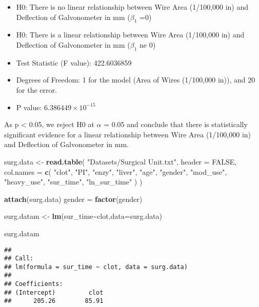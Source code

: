 \documentclass[
]{article}
\newenvironment{Shaded}{\begin{snugshade}}{\end{snugshade}}
\newcommand{\AttributeTok}[1]{\textcolor[rgb]{0.13,0.29,0.53}{#1}}
\newcommand{\ConstantTok}[1]{\textcolor[rgb]{0.56,0.35,0.01}{#1}}
\newcommand{\FunctionTok}[1]{\textcolor[rgb]{0.13,0.29,0.53}{\textbf{#1}}}
\newcommand{\NormalTok}[1]{#1}
\newcommand{\OtherTok}[1]{\textcolor[rgb]{0.56,0.35,0.01}{#1}}
\newcommand{\SpecialCharTok}[1]{\textcolor[rgb]{0.81,0.36,0.00}{\textbf{#1}}}
\newcommand{\StringTok}[1]{\textcolor[rgb]{0.31,0.60,0.02}{#1}}
\begin{document}
\begin{itemize}
\item
  H0: There is no linear relationship between Wire Area (1/100,000 in)
  and Deflection of Galvonometer in mm (\(\beta_1\) =0)
\item
  H0: There is a linear relationship between Wire Area (1/100,000 in)
  and Deflection of Galvonometer in mm (\(\beta_1\) ne 0)
\item
  Test Statistic (F value): 422.6036859
\item
  Degrees of Freedom: 1 for the model (Area of Wires (1/100,000 in)),
  and 20 for the error.
\item
  P value: \ensuremath{6.386449\times 10^{-15}}
\end{itemize}

As p \textless{} 0.05, we reject H0 at \(\alpha\) = 0.05 and conclude
that there is statistically significant evidence for a linear
relationship between Wire Area (1/100,000 in) and Deflection of
Galvonometer in mm.

\begin{Shaded}
\begin{Highlighting}[]
\NormalTok{surg.data }\OtherTok{\textless{}{-}} \FunctionTok{read.table}\NormalTok{(}
  \StringTok{"Datasets/Surgical Unit.txt"}\NormalTok{,}
  \AttributeTok{header =} \ConstantTok{FALSE}\NormalTok{,}
  \AttributeTok{col.names =} \FunctionTok{c}\NormalTok{(}
    \StringTok{"clot"}\NormalTok{,}
    \StringTok{"PI"}\NormalTok{,}
    \StringTok{"enzy"}\NormalTok{,}
    \StringTok{"liver"}\NormalTok{,}
    \StringTok{"age"}\NormalTok{,}
    \StringTok{"gender"}\NormalTok{,}
    \StringTok{"mod\_use"}\NormalTok{,}
    \StringTok{"heavy\_use"}\NormalTok{,}
    \StringTok{"sur\_time"}\NormalTok{,}
    \StringTok{"ln\_sur\_time"}
\NormalTok{  )}
\NormalTok{)}

\FunctionTok{attach}\NormalTok{(surg.data)}
\NormalTok{gender }\OtherTok{=} \FunctionTok{factor}\NormalTok{(gender)}

\NormalTok{surg.datam }\OtherTok{\textless{}{-}} \FunctionTok{lm}\NormalTok{(sur\_time}\SpecialCharTok{\textasciitilde{}}\NormalTok{clot,}\AttributeTok{data=}\NormalTok{surg.data)}

\NormalTok{surg.datam}
\end{Highlighting}
\end{Shaded}

\begin{verbatim}
## 
## Call:
## lm(formula = sur_time ~ clot, data = surg.data)
## 
## Coefficients:
## (Intercept)         clot  
##      205.26        85.91
\end{verbatim}
\end{document}
